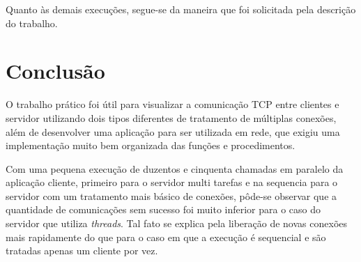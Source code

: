 \documentclass[10pt]{extarticle}
\begin{document}
Quanto às demais execuções, segue-se da maneira que foi solicitada pela descrição do trabalho.

\section{Conclusão}
O trabalho prático foi útil para visualizar a comunicação TCP entre clientes e servidor utilizando dois tipos diferentes de tratamento de múltiplas conexões, além de desenvolver uma aplicação para ser utilizada em rede, que exigiu uma implementação muito bem organizada das funções e procedimentos.

Com uma pequena execução de duzentos e cinquenta chamadas em paralelo da aplicação cliente, primeiro para o servidor multi tarefas e na sequencia para o servidor com um tratamento mais básico de conexões, pôde-se observar que a quantidade de comunicações sem sucesso foi muito inferior para o caso do servidor que utiliza \textit{threads}. Tal fato se explica pela liberação de novas conexões mais rapidamente do que para o caso em que a execução é sequencial e são tratadas apenas um cliente por vez.
\end{document}
